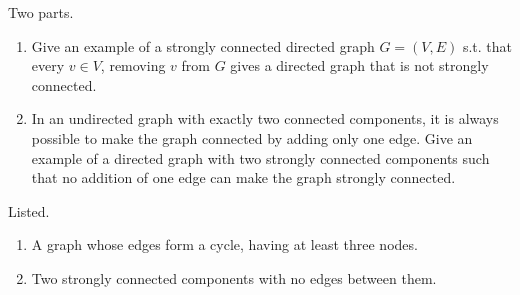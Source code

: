   \begin{exercise}
    Two parts. 
    \begin{enumerate}
      \item Give an example of a strongly connected directed graph $G = (V, E)$ s.t. that every $v \in V$, removing $v$ from $G$ gives a directed graph that is not strongly connected. 
      \item In an undirected graph with exactly two connected components, it is always possible to make the graph connected by adding only one edge. Give an example of a directed graph with two strongly connected components such that no addition of one edge can make the graph strongly connected.
    \end{enumerate}
  \end{exercise}
  \begin{solution}
    Listed. 
    \begin{enumerate}
      \item A graph whose edges form a cycle, having at least three nodes.
      \item Two strongly connected components with no edges between them.
    \end{enumerate}
  \end{solution} 


